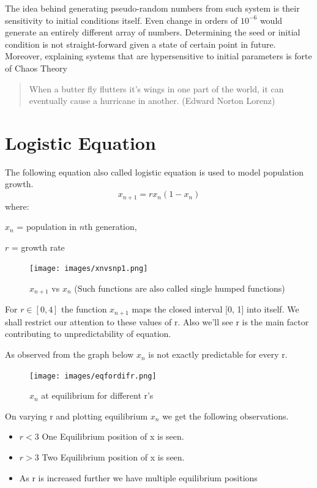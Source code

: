 \documentclass{report}
\begin{document}
The idea behind generating pseudo-random numbers from such system is their sensitivity  to initial conditions itself. Even change in orders of $10^{-6}$ would generate an entirely different array of numbers. Determining the seed or initial condition is not straight-forward given a state of certain point in future. Moreover, explaining systems that are hypersensitive to initial parameters is forte of Chaos Theory

\begin{quote}
When a butter fly flutters it's wings in one part of the world, it can eventually cause a hurricane in another.  (Edward Norton Lorenz)
\end{quote}


\newpage
\section{Logistic Equation}
\raggedright
The following equation also called logistic equation is used to model population growth.
\begin{equation}
x_{n+1} = rx_n(1-x_n) \nonumber
\end{equation}
where:

$x_n$ = population in $n$th generation,

$r$ = growth rate

\begin{figure}[!h]
    \centering
    \texttt{[image: images/xnvsnp1.png]}
    \caption{$x_{n+1}$ vs $x_n$ (Such functions are also called single humped functions)}
    \label{fig:my_label}
\end{figure}

For $r \in [0, 4]$ the function $x_{n+1}$ maps the closed interval [0, 1] into itself. We shall
restrict our attention to these values of r. Also we'll see r is the main factor contributing to unpredictability of equation.

As observed from the graph below $x_{n}$ is not exactly predictable for every r.

\begin{figure}[!h]
    \centering
    \texttt{[image: images/eqfordifr.png]}
    \caption{$x_n$ at equilibrium for different r's}
    \label{fig:my_label2}
\end{figure}

On varying r and plotting equilibrium $x_{n}$ we get the following observations.

\begin{itemize}
  \item $r < 3$ One Equilibrium position of x is seen.
  \item $r > 3$ Two Equilibrium position of x is seen.
  \item As r is increased further we have multiple equilibrium positions
\end{itemize}
\newpage
\end{document}
